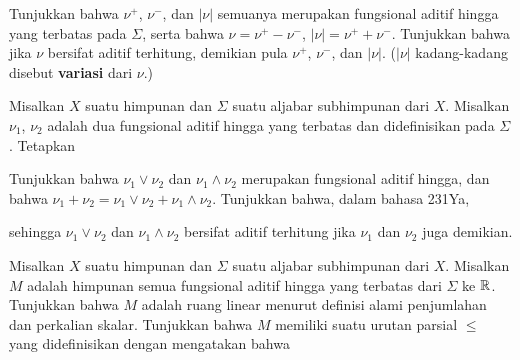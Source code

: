 { 
      
      
      
\noindent Tunjukkan bahwa $\nu^+$, $\nu^-$, dan $|\nu|$ semuanya 
merupakan fungsional aditif hingga yang terbatas pada $\Sigma$, serta bahwa 
$\nu=\nu^+-\nu^-$, $|\nu|=\nu^++\nu^-$.   Tunjukkan bahwa jika $\nu$ 
bersifat aditif terhitung, demikian pula $\nu^+$, $\nu^-$, dan $|\nu|$. 
($|\nu|$ kadang-kadang disebut {\bf variasi} dari $\nu$.) 
      
 Misalkan $X$ suatu himpunan dan $\Sigma$ suatu 
aljabar subhimpunan dari $X$.   Misalkan $\nu_1$, $\nu_2$ adalah dua 
fungsional aditif hingga yang terbatas dan didefinisikan pada $\Sigma$. 
Tetapkan 
      
      
      
\noindent Tunjukkan bahwa $\nu_1\vee\nu_2$ dan $\nu_1\wedge\nu_2$ 
merupakan fungsional aditif hingga, dan bahwa 
$\nu_1+\nu_2=\nu_1\vee\nu_2+\nu_1\wedge\nu_2$. 
Tunjukkan bahwa, dalam bahasa 231Ya, 
      
      
      
\noindent sehingga $\nu_1\vee\nu_2$ dan $\nu_1\wedge\nu_2$ bersifat 
aditif terhitung jika $\nu_1$ dan $\nu_2$ juga demikian. 
      
 Misalkan $X$ suatu himpunan dan $\Sigma$ suatu 
aljabar subhimpunan dari $X$.   Misalkan $M$ adalah himpunan semua 
fungsional aditif hingga yang terbatas dari $\Sigma$ ke $\Bbb R$. 
Tunjukkan bahwa $M$ adalah ruang linear menurut definisi alami penjumlahan 
dan perkalian skalar.   Tunjukkan bahwa $M$ memiliki suatu urutan parsial 
$\le$ yang didefinisikan dengan mengatakan bahwa 
      
      
}
